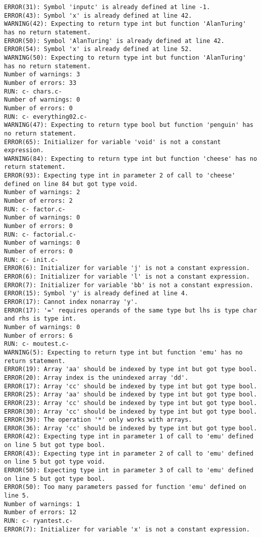 \documentclass[12pt]{book}
\begin{document}
\begin{lstlisting}
ERROR(31): Symbol 'inputc' is already defined at line -1.
ERROR(43): Symbol 'x' is already defined at line 42.
WARNING(42): Expecting to return type int but function 'AlanTuring' has no return statement.
ERROR(50): Symbol 'AlanTuring' is already defined at line 42.
ERROR(54): Symbol 'x' is already defined at line 52.
WARNING(50): Expecting to return type int but function 'AlanTuring' has no return statement.
Number of warnings: 3
Number of errors: 33
RUN: c- chars.c-
Number of warnings: 0
Number of errors: 0
RUN: c- everything02.c-
WARNING(47): Expecting to return type bool but function 'penguin' has no return statement.
ERROR(65): Initializer for variable 'void' is not a constant expression.
WARNING(84): Expecting to return type int but function 'cheese' has no return statement.
ERROR(93): Expecting type int in parameter 2 of call to 'cheese' defined on line 84 but got type void.
Number of warnings: 2
Number of errors: 2
RUN: c- factor.c-
Number of warnings: 0
Number of errors: 0
RUN: c- factorial.c-
Number of warnings: 0
Number of errors: 0
RUN: c- init.c-
ERROR(6): Initializer for variable 'j' is not a constant expression.
ERROR(6): Initializer for variable 'l' is not a constant expression.
ERROR(7): Initializer for variable 'bb' is not a constant expression.
ERROR(15): Symbol 'y' is already defined at line 4.
ERROR(17): Cannot index nonarray 'y'.
ERROR(17): '=' requires operands of the same type but lhs is type char and rhs is type int.
Number of warnings: 0
Number of errors: 6
RUN: c- moutest.c-
WARNING(5): Expecting to return type int but function 'emu' has no return statement.
ERROR(19): Array 'aa' should be indexed by type int but got type bool.
ERROR(20): Array index is the unindexed array 'dd'.
ERROR(17): Array 'cc' should be indexed by type int but got type bool.
ERROR(25): Array 'aa' should be indexed by type int but got type bool.
ERROR(23): Array 'cc' should be indexed by type int but got type bool.
ERROR(30): Array 'cc' should be indexed by type int but got type bool.
ERROR(39): The operation '*' only works with arrays.
ERROR(36): Array 'cc' should be indexed by type int but got type bool.
ERROR(42): Expecting type int in parameter 1 of call to 'emu' defined on line 5 but got type bool.
ERROR(43): Expecting type int in parameter 2 of call to 'emu' defined on line 5 but got type void.
ERROR(50): Expecting type int in parameter 3 of call to 'emu' defined on line 5 but got type bool.
ERROR(50): Too many parameters passed for function 'emu' defined on line 5.
Number of warnings: 1
Number of errors: 12
RUN: c- ryantest.c-
ERROR(7): Initializer for variable 'x' is not a constant expression.

\end{lstlisting}
\end{document}
